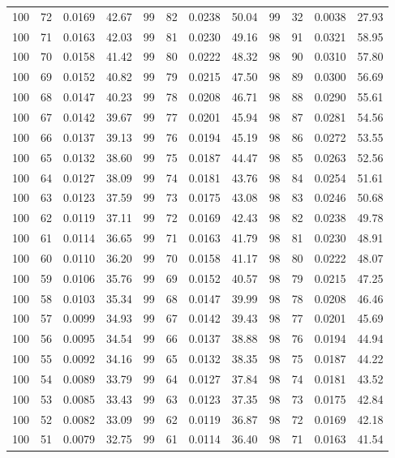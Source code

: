 \begin{tabular}{llll|llll|llll}
100 & 72 & 0.0169 & 42.67 & 99 & 82 & 0.0238 & 50.04 & 99 & 32 & 0.0038 & 27.93\\
100 & 71 & 0.0163 & 42.03 & 99 & 81 & 0.0230 & 49.16 & 98 & 91 & 0.0321 & 58.95\\
100 & 70 & 0.0158 & 41.42 & 99 & 80 & 0.0222 & 48.32 & 98 & 90 & 0.0310 & 57.80\\
100 & 69 & 0.0152 & 40.82 & 99 & 79 & 0.0215 & 47.50 & 98 & 89 & 0.0300 & 56.69\\
100 & 68 & 0.0147 & 40.23 & 99 & 78 & 0.0208 & 46.71 & 98 & 88 & 0.0290 & 55.61\\
100 & 67 & 0.0142 & 39.67 & 99 & 77 & 0.0201 & 45.94 & 98 & 87 & 0.0281 & 54.56\\
100 & 66 & 0.0137 & 39.13 & 99 & 76 & 0.0194 & 45.19 & 98 & 86 & 0.0272 & 53.55\\
100 & 65 & 0.0132 & 38.60 & 99 & 75 & 0.0187 & 44.47 & 98 & 85 & 0.0263 & 52.56\\
100 & 64 & 0.0127 & 38.09 & 99 & 74 & 0.0181 & 43.76 & 98 & 84 & 0.0254 & 51.61\\
100 & 63 & 0.0123 & 37.59 & 99 & 73 & 0.0175 & 43.08 & 98 & 83 & 0.0246 & 50.68\\
100 & 62 & 0.0119 & 37.11 & 99 & 72 & 0.0169 & 42.43 & 98 & 82 & 0.0238 & 49.78\\
100 & 61 & 0.0114 & 36.65 & 99 & 71 & 0.0163 & 41.79 & 98 & 81 & 0.0230 & 48.91\\
100 & 60 & 0.0110 & 36.20 & 99 & 70 & 0.0158 & 41.17 & 98 & 80 & 0.0222 & 48.07\\
100 & 59 & 0.0106 & 35.76 & 99 & 69 & 0.0152 & 40.57 & 98 & 79 & 0.0215 & 47.25\\
100 & 58 & 0.0103 & 35.34 & 99 & 68 & 0.0147 & 39.99 & 98 & 78 & 0.0208 & 46.46\\
100 & 57 & 0.0099 & 34.93 & 99 & 67 & 0.0142 & 39.43 & 98 & 77 & 0.0201 & 45.69\\
100 & 56 & 0.0095 & 34.54 & 99 & 66 & 0.0137 & 38.88 & 98 & 76 & 0.0194 & 44.94\\
100 & 55 & 0.0092 & 34.16 & 99 & 65 & 0.0132 & 38.35 & 98 & 75 & 0.0187 & 44.22\\
100 & 54 & 0.0089 & 33.79 & 99 & 64 & 0.0127 & 37.84 & 98 & 74 & 0.0181 & 43.52\\
100 & 53 & 0.0085 & 33.43 & 99 & 63 & 0.0123 & 37.35 & 98 & 73 & 0.0175 & 42.84\\
100 & 52 & 0.0082 & 33.09 & 99 & 62 & 0.0119 & 36.87 & 98 & 72 & 0.0169 & 42.18\\
100 & 51 & 0.0079 & 32.75 & 99 & 61 & 0.0114 & 36.40 & 98 & 71 & 0.0163 & 41.54\\

\end{tabular}
